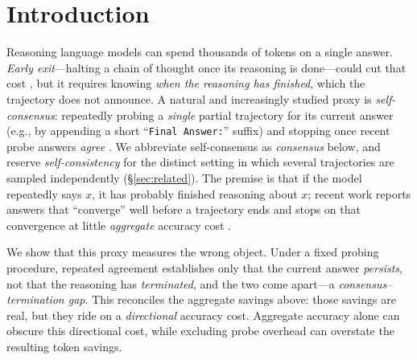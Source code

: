 \section{Introduction}
\label{sec:intro}

Reasoning language models \citep{deepseekr1,qwen3,openai_o1} can spend thousands
of tokens on a single answer. \emph{Early exit}---halting a chain of thought once
its reasoning is done---could cut that cost \citep{overthinking,dynasor_certaindex},
but it requires knowing \emph{when the reasoning has finished}, which the
trajectory does not announce. A natural and increasingly studied proxy is
\emph{self-consensus}: repeatedly probing a \emph{single} partial trajectory for
its current answer (e.g., by appending a short ``\texttt{Final Answer:}''
suffix) and stopping once recent probe answers \emph{agree}
\citep{dynasor_certaindex}. We abbreviate self-consensus as \emph{consensus}
below, and reserve \emph{self-consistency} for the distinct setting in which
several trajectories are sampled independently (\S\ref{sec:related}).
The premise is that if the model
repeatedly says $x$, it has probably finished reasoning about $x$; recent work
reports answers that ``converge'' well before a trajectory ends and stops on that
convergence at little \emph{aggregate} accuracy cost
\citep{liu2025answerconvergence}.

We show that this proxy measures the wrong object. Under a fixed probing
procedure, repeated agreement establishes only that the current answer
\emph{persists}, not that the reasoning has \emph{terminated}, and the two come
apart---a \emph{consensus--termination gap}. This
reconciles the aggregate savings above: those savings are real, but they ride on
a \emph{directional} accuracy cost. Aggregate accuracy alone can obscure this
directional cost, while excluding probe overhead can overstate the resulting
token savings.

